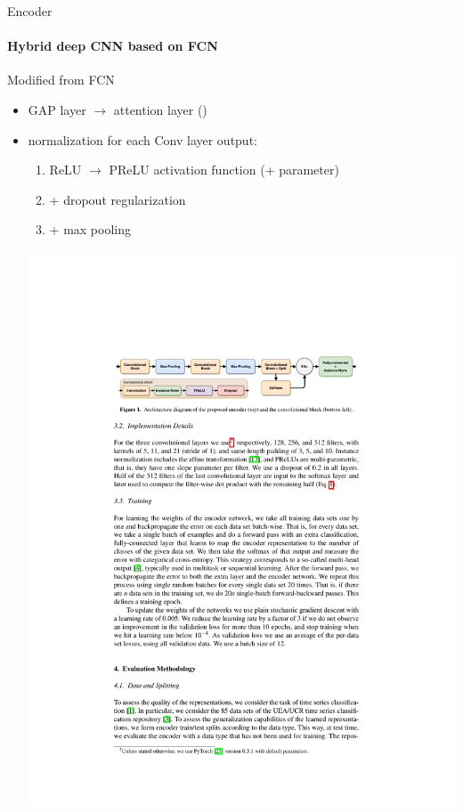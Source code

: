 \documentclass[aspectratio=169]{ctexbeamer}
\begin{document}
\begin{frame}{Encoder}
	\framesubtitle{Hybrid deep CNN based on FCN}
	Modified from FCN
	\begin{itemize}
		\item GAP layer $\to$ attention layer ({\color{red}{careful design for pre-train}})
		\item normalization for each Conv layer output:
		\begin{enumerate}
			\item ReLU $\to$ PReLU activation function (+ parameter)
			\item + dropout regularization
			\item + max pooling
		\end{enumerate}
		\begin{center}
			\includegraphics[width = .95\textwidth]{figure/encoder}
		\end{center}
	\end{itemize}
\end{frame}
\end{document}
